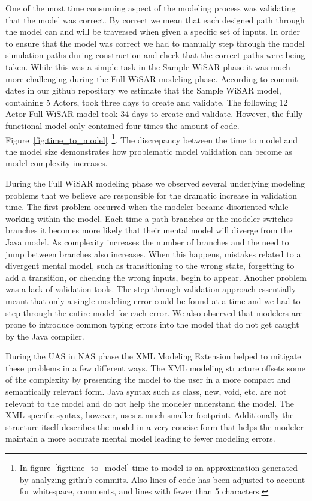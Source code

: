 One of the most time consuming aspect of the modeling process was validating that the model was correct.  By correct we mean that each designed path through the model can and will be traversed when given a specific set of inputs.  In order to ensure that the model was correct we had to manually step through the model simulation paths during construction and check that the correct paths were being taken.  While this was a simple task in the Sample WiSAR phase it was much more challenging during the Full WiSAR modeling phase.  According to commit dates in our github repository we estimate that the Sample WiSAR model, containing 5 Actors, took three days to create and validate.  The following 12 Actor Full WiSAR model took 34 days to create and validate.  However, the fully functional model only contained four times the amount of code.  Figure~\ref{fig:time_to_model}~\footnote{In figure~\ref{fig:time_to_model} time to model is an approximation generated by analyzing github commits.  Also lines of code has been adjusted to account for whitespace, comments, and lines with fewer than 5 characters.}.  The discrepancy between the time to model and the model size demonstrates how problematic model validation can become as model complexity increases.

During the Full WiSAR modeling phase we observed several underlying modeling problems that we believe are responsible for the dramatic increase in validation time.  The first problem occurred when the modeler became disoriented while working within the model.  Each time a path branches or the modeler switches branches it becomes more likely that their mental model will diverge from the Java model.  As complexity increases the number of branches and the need to jump between branches also increases.  When this happens, mistakes related to a divergent mental model, such as transitioning to the wrong state, forgetting to add a transition, or checking the wrong inputs, begin to appear.  Another problem was a lack of validation tools.  The step-through validation approach essentially meant that only a single modeling error could be found at a time and we had to step through the entire model for each error.  We also observed that modelers are prone to introduce common typing errors into the model that do not get caught by the Java compiler.  

During the UAS in NAS phase the XML Modeling Extension helped to mitigate these problems in a few different ways.  The XML modeling structure offsets some of the complexity by presenting the model to the user in a more compact and semantically relevant form.  Java syntax such as class, new, void, etc. are not relevant to the model and do not help the modeler understand the model.  The XML specific syntax, however, uses a much smaller footprint.  Additionally the structure itself describes the model in a very concise form that helps the modeler maintain a more accurate mental model leading to fewer modeling errors.

